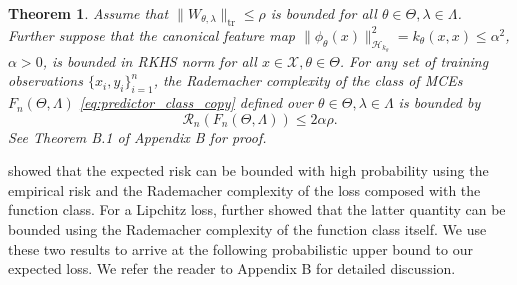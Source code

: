 \documentclass[twoside]{article}
\newtheorem{theorem}{Theorem}[section]
\begin{document}
%					

		\begin{theorem}
			\label{thm:rademacher_complexity_bound_copy}
			Assume that $\| W_{\theta, \lambda} \|_{\mathrm{tr}} \leq \rho$ is bounded for all $\theta \in \Theta, \lambda \in \Lambda$. Further suppose that the canonical feature map $\| \phi_{\theta}(x) \|_{\mathcal{H}_{k_{\theta}}}^{2} = k_{\theta}(x, x) \leq \alpha^{2}$, $\alpha > 0$, is bounded in \gls{RKHS} norm for all $x \in \mathcal{X}, \theta \in \Theta$. For any set of training observations $\{x_{i}, y_{i}\}_{i = 1}^{n}$, the Rademacher complexity of the class of \glspl{MCE} $F_{n}(\Theta, \Lambda)$ \eqref{eq:predictor_class_copy} defined over $\theta \in \Theta, \lambda \in \Lambda$ is bounded by
			\begin{equation}
			\mathcal{R}_{n}(F_{n}(\Theta, \Lambda)) \leq 2 \alpha \rho.
			\label{eq:rademacher_complexity_bound_copy}
			\end{equation}
			See Theorem B.1 of Appendix B for proof.
		\end{theorem}
		
		\cite{bartlett2002rademacher} showed that the expected risk can be bounded with high probability using the empirical risk and the Rademacher complexity of the loss composed with the function class. For a Lipchitz loss, \citet{ledoux2013probability} further showed that the latter quantity can be bounded using the Rademacher complexity of the function class itself. We use these two results to arrive at the following probabilistic upper bound to our expected loss. We refer the reader to Appendix B for detailed discussion.
		
\end{document}
